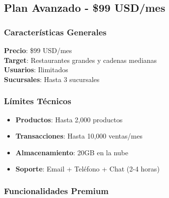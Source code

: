 \documentclass[12pt,a4paper]{article}
\begin{document}
\subsection{Plan Avanzado - \$99 USD/mes}

\subsubsection{Características Generales}

\begin{tcolorbox}[colback=accentpurple!10, colframe=accentpurple, title=Plan Avanzado]
    \textbf{Precio}: \$99 USD/mes\\
    \textbf{Target}: Restaurantes grandes y cadenas medianas\\
    \textbf{Usuarios}: Ilimitados\\
    \textbf{Sucursales}: Hasta 3 sucursales
\end{tcolorbox}

\subsubsection{Límites Técnicos}

\begin{itemize}
    \item \textbf{Productos}: Hasta 2,000 productos
    \item \textbf{Transacciones}: Hasta 10,000 ventas/mes
    \item \textbf{Almacenamiento}: 20GB en la nube
    \item \textbf{Soporte}: Email + Teléfono + Chat (2-4 horas)
\end{itemize}

\subsubsection{Funcionalidades Premium}
\end{document}

